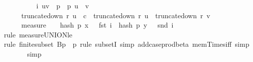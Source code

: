 \begin{isabellebody}
\ \ \ \ \isamarkupfalse%
\ \isamarkupfalse%
\ {\isachardoublequoteopen}{\isachardot}{\kern0pt}{\isachardot}{\kern0pt}{\isachardot}{\kern0pt}\ {\isasymle}\ {\isacharparenleft}{\kern0pt}{\isasymSum}\ i{\isasymin}\ {\isacharbraceleft}{\kern0pt}{\isacharparenleft}{\kern0pt}u{\isacharcomma}{\kern0pt}v{\isacharparenright}{\kern0pt}\ {\isasymin}\ {\isacharbraceleft}{\kern0pt}{}{\isachardot}{\kern0pt}{\isachardot}{\kern0pt}{\isacharless}{\kern0pt}p{\isacharbraceright}{\kern0pt}\ {\isasymtimes}\ {\isacharbraceleft}{\kern0pt}{}{\isachardot}{\kern0pt}{\isachardot}{\kern0pt}{\isacharless}{\kern0pt}p{\isacharbraceright}{\kern0pt}{\isachardot}{\kern0pt}\ u\ {\isasymnoteq}\ v\ {\isasymand}\isanewline
\ \ \ \ \ \ truncate{\isacharunderscore}{\kern0pt}down\ r\ u\ {\isasymle}\ c\ {\isasymand}\ truncate{\isacharunderscore}{\kern0pt}down\ r\ u\ {\isacharequal}{\kern0pt}\ truncate{\isacharunderscore}{\kern0pt}down\ r\ v{\isacharbraceright}{\kern0pt}{\isachardot}{\kern0pt}\ \isanewline
\ \ \ \ \ \ measure\ {\isasymOmega}\ \ {\isacharbraceleft}{\kern0pt}{\isasymomega}{\isachardot}{\kern0pt}\ hash\ p\ x\ {\isasymomega}\ {\isacharequal}{\kern0pt}\ fst\ i\ {\isasymand}\ hash\ p\ y\ {\isasymomega}\ {\isacharequal}{\kern0pt}\ snd\ i{\isacharbraceright}{\kern0pt}{\isacharparenright}{\kern0pt}{\isachardoublequoteclose}\isanewline
\ \ \ \ \ \ \isamarkupfalse%
\ {\isacharparenleft}{\kern0pt}rule\ measure{\isacharunderscore}{\kern0pt}UNION{\isacharunderscore}{\kern0pt}le{\isacharparenright}{\kern0pt}\isanewline
\ \ \ \ \ \ \ \isamarkupfalse%
\ {\isacharparenleft}{\kern0pt}rule\ finite{\isacharunderscore}{\kern0pt}subset{\isacharbrackleft}{\kern0pt}\ B{\isacharequal}{\kern0pt}{\isachardoublequoteopen}{\isacharbraceleft}{\kern0pt}{}{\isachardot}{\kern0pt}{\isachardot}{\kern0pt}{\isacharless}{\kern0pt}p{\isacharbraceright}{\kern0pt}\ {\isasymtimes}\ {\isacharbraceleft}{\kern0pt}{}{\isachardot}{\kern0pt}{\isachardot}{\kern0pt}{\isacharless}{\kern0pt}p{\isacharbraceright}{\kern0pt}{\isachardoublequoteclose}{\isacharbrackright}{\kern0pt}{\isacharcomma}{\kern0pt}\ rule\ subsetI{\isacharcomma}{\kern0pt}\ simp\ add{\isacharcolon}{\kern0pt}case{\isacharunderscore}{\kern0pt}prod{\isacharunderscore}{\kern0pt}beta\ mem{\isacharunderscore}{\kern0pt}Times{\isacharunderscore}{\kern0pt}iff{\isacharcomma}{\kern0pt}\ simp{\isacharparenright}{\kern0pt}\isanewline
\ \ \ \ \ \ \isamarkupfalse%
\ simp\isanewline
\ \ \ \ \isamarkupfalse%
\ \isamarkupfalse%

\end{isabellebody}
